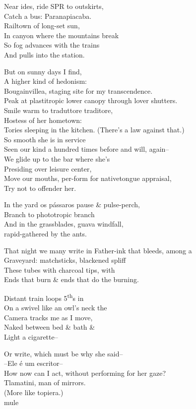 Near ides, ride SPR to outskirts, \\
Catch a bus: Paranapiacaba. \\
Railtown of long-set sun, \\
In canyon where the mountains break \\
So fog advances with the trains \\
And pulls into the station.

But on sunny days I find, \\
A higher kind of hedonism: \\
Bougainvillea, staging site for my transcendence. \\
Peak at plastitropic lower canopy through lover shutters. \\
Smile warm to traduttore traditore, \\
Hostess of her hometown: \\
Tories sleeping in the kitchen.
(There's a law against that.) \\
So smooth she is in service \\
Seen our kind a hundred times before and will, again-- \\
We glide up to the bar where she's \\
Presiding over leisure center, \\ 
Move our mouths, per-form for nativetongue appraisal, \\
Try not to offender her.

In the yard os pássaros pause \& pulse-perch, \\
Branch to phototropic branch \\
And in the grassblades, guava windfall, \\
rapid-gathered by the ants.

That night we many write in Father-ink that bleeds, among a \\
Graveyard: matchsticks, blackened spliff \\
These tubes with charcoal tips, with \\
Ends that burn \& ends that do the burning.

Distant train loops 5\textsuperscript{th}s in \ \\
On a swivel like an owl's neck the \\
Camera tracks me as I move, \\
Naked between bed \& bath \& \\
Light a cigarette--

Or write, which must be why she said-- \\
--Ele é um escritor-- \\
How now can I act, without performing for her gaze? \\
Tlamatini, man of mirrors. \\
(More like topiera.) \\
\hfill mule


